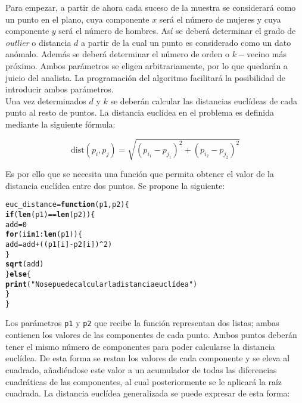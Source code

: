 \documentclass[12pt]{report}\usepackage[]{graphicx}\usepackage[dvipsnames]{xcolor}
\makeatletter
\newcommand{\hlnum}[1]{\textcolor[rgb]{0.686,0.059,0.569}{#1}}%
\newcommand{\hlstr}[1]{\textcolor[rgb]{0.192,0.494,0.8}{#1}}%
\newcommand{\hlopt}[1]{\textcolor[rgb]{0,0,0}{#1}}%
\newcommand{\hlstd}[1]{\textcolor[rgb]{0.345,0.345,0.345}{#1}}%
\newcommand{\hlkwa}[1]{\textcolor[rgb]{0.161,0.373,0.58}{\textbf{#1}}}%
\newcommand{\hlkwb}[1]{\textcolor[rgb]{0.69,0.353,0.396}{#1}}%
\newcommand{\hlkwc}[1]{\textcolor[rgb]{0.333,0.667,0.333}{#1}}%
\newcommand{\hlkwd}[1]{\textcolor[rgb]{0.737,0.353,0.396}{\textbf{#1}}}%
\newenvironment{kframe}{%
 \def\at@end@of@kframe{}%
 \ifinner\ifhmode%
  \def\at@end@of@kframe{\end{minipage}}%
  \begin{minipage}{\columnwidth}%
 \fi\fi%
 \def\FrameCommand##1{\hskip\@totalleftmargin \hskip-\fboxsep
 \colorbox{shadecolor}{##1}\hskip-\fboxsep
     \hskip-\linewidth \hskip-\@totalleftmargin \hskip\columnwidth}%
 \MakeFramed {\advance\hsize-\width
   \@totalleftmargin\z@ \linewidth\hsize
   \@setminipage}}%
 {\par\unskip\endMakeFramed%
 \at@end@of@kframe}
\newenvironment{knitrout}{}{} %
\newcommand{\dt}{\text{dist}}
\makeatother
\begin{document}
					Para empezar, a partir de ahora cada suceso de la muestra se considerará como un punto en el plano, cuya componente $x$ será el número de mujeres y cuya componente $y$ será el número de hombres. Así se deberá determinar el grado de \textit{outlier} o distancia $d$ a partir de la cual un punto es considerado como un dato anómalo. Además se deberá determinar el número de orden o $k-$vecino más próximo. Ambos parámetros se eligen arbitrariamente, por lo que quedarán a juicio del analista. La programación del algoritmo facilitará la posibilidad de introducir ambos parámetros.\\
					
					Una vez determinados $d$ y $k$ se deberán calcular las distancias euclídeas de cada punto al resto de puntos. La distancia euclídea en el problema es definida mediante la siguiente fórmula:
					
					$$
					\dt(p_i, p_j) = \sqrt{(p_{i_1}-p_{j_1})^2 + (p_{i_2}-p_{j_2})^2}
					$$
					
					Es por ello que se necesita una función que permita obtener el valor de la distancia euclídea entre dos puntos. Se propone la siguiente:
					
\begin{knitrout}
\color{fgcolor}\begin{kframe}
\begin{alltt}
\hlstd{euc_distance} \hlkwb{=} \hlkwa{function}\hlstd{(}\hlkwc{p1}\hlstd{,}\hlkwc{p2}\hlstd{) \{}
        \hlkwa{if}\hlstd{(}\hlkwd{len}\hlstd{(p1)} \hlopt{==} \hlkwd{len}\hlstd{(p2)) \{}
                \hlstd{add} \hlkwb{=} \hlnum{0}
                \hlkwa{for}\hlstd{(i} \hlkwa{in} \hlnum{1}\hlopt{:}\hlkwd{len}\hlstd{(p1)) \{}
                        \hlstd{add} \hlkwb{=} \hlstd{add} \hlopt{+} \hlstd{((p1[i]} \hlopt{-} \hlstd{p2[i])}\hlopt{^}\hlnum{2}\hlstd{)}
                \hlstd{\}}
                \hlkwd{sqrt}\hlstd{(add)}
        \hlstd{\}} \hlkwa{else} \hlstd{\{}
                \hlkwd{print}\hlstd{(}\hlstr{"No se puede calcular la distancia euclídea"}\hlstd{)}
        \hlstd{\}}
\hlstd{\}}
\end{alltt}
\end{kframe}
\end{knitrout}
					
					Los parámetros \texttt{p1} y \texttt{p2} que recibe la función representan dos listas; ambas contienen los valores de las componentes de cada punto. Ambos puntos deberán tener el mismo número de componentes para poder calcularse la distancia euclídea. De esta forma se restan los valores de cada componente y se eleva al cuadrado, añadiéndose este valor a un acumulador de todas las diferencias cuadráticas de las componentes, al cual posteriormente se le aplicará la raíz cuadrada. La distancia euclídea generalizada se puede expresar de esta forma:
					
\end{document}
